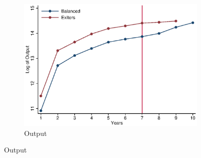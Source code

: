 \documentclass[11pt]{article}
\begin{document}
\begin{figure}[ht]
	\caption{Time series by samples}\label{fig:time}
	\centering	
	\begin{subfigure}[b]{.23\textwidth}
		\centering
		\caption{Output}
		\includegraphics[width=\textwidth]{timeY.eps}


\end{subfigure}
\end{figure}
\end{document}
